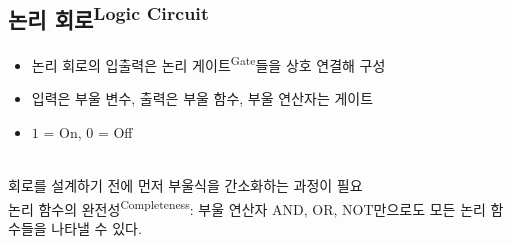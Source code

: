 \subsection{논리 회로\textsuperscript{Logic Circuit}}
\begin{itemize}
    \item 논리 회로의 입출력은 논리 게이트\textsuperscript{Gate}들을 상호 연결해 구성
    \item 입력은 부울 변수, 출력은 부울 함수, 부울 연산자는 게이트
    \item $1$ = On, $0$ = Off
\end{itemize}
\phantom{}\\
회로를 설계하기 전에 먼저 부울식을 간소화하는 과정이 필요
\\
논리 함수의 완전성\textsuperscript{Completeness}: 부울 연산자 AND, OR, NOT만으로도 모든 논리 함수들을 나타낼 수 있다.\\\\
